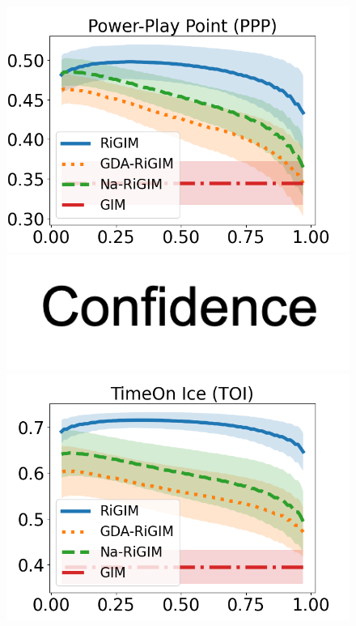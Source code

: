 \documentclass{article}
\begin{document}
\begin{figure}[htbp]
\begin{minipage}{0.16\textwidth}
    \includegraphics[scale=0.14]{figures/risk_curve_PPP_shadow.png}\par
    \vspace{-0.05in}
    \includegraphics[scale=0.12]{figures/confidence_x_label.png}
    \end{minipage}
    \begin{minipage}{0.16\textwidth}
    \centering
    \includegraphics[scale=0.14]{figures/risk_curve_GP_shadow.png}\par

\end{minipage}
\end{figure}
\end{document}
